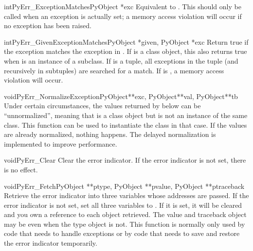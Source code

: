 \documentclass{manual}
\begin{document}
\begin{cfuncdesc}{int}{PyErr_ExceptionMatches}{PyObject *exc}
Equivalent to
.
This should only be called when an exception is actually set; a memory 
access violation will occur if no exception has been raised.
\end{cfuncdesc}

\begin{cfuncdesc}{int}{PyErr_GivenExceptionMatches}{PyObject *given, PyObject *exc}
Return true if the  exception matches the exception in
.  If  is a class object, this also returns true
when  is an instance of a subclass.  If  is a tuple, all
exceptions in the tuple (and recursively in subtuples) are searched
for a match.  If  is \NULL, a memory access violation will
occur.
\end{cfuncdesc}

\begin{cfuncdesc}{void}{PyErr_NormalizeException}{PyObject**exc, PyObject**val, PyObject**tb}
Under certain circumstances, the values returned by
 below can be ``unnormalized'', meaning that
 is a class object but  is not an
instance of the  same class.  This function can be used to instantiate
the class in that case.  If the values are already normalized, nothing
happens.  The delayed normalization is implemented to improve
performance.
\end{cfuncdesc}

\begin{cfuncdesc}{void}{PyErr_Clear}{}
Clear the error indicator.  If the error indicator is not set, there
is no effect.
\end{cfuncdesc}

\begin{cfuncdesc}{void}{PyErr_Fetch}{PyObject **ptype, PyObject **pvalue,
                                     PyObject **ptraceback}
Retrieve the error indicator into three variables whose addresses are
passed.  If the error indicator is not set, set all three variables to
\NULL{}.  If it is set, it will be cleared and you own a reference to
each object retrieved.  The value and traceback object may be
\NULL{} even when the type object is not.    This
function is normally only used by code that needs to handle exceptions
or by code that needs to save and restore the error indicator
temporarily.
\end{cfuncdesc}
\end{document}
